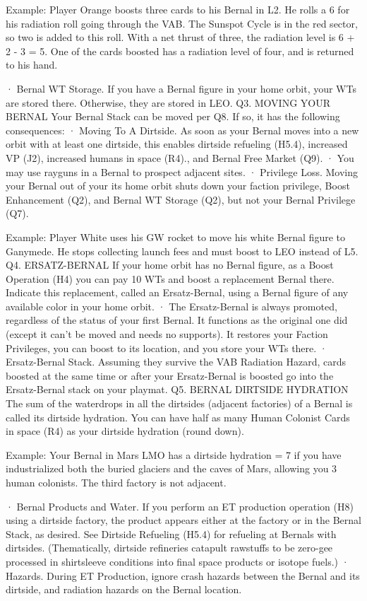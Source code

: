 \documentclass[a4paper]{book}
\begin{document}
Example: Player Orange boosts three cards to his Bernal in L2. He rolls a 6 for his radiation roll going through the VAB. The Sunspot Cycle is in the red sector, so two is added to this roll. With a net thrust of three, the radiation level is 6 + 2 - 3 = 5. One of the cards boosted has a radiation level of four, and is returned to his hand.

·       Bernal WT Storage. If you have a Bernal figure in your home orbit, your WTs are stored there. Otherwise, they are stored in LEO.
Q3. MOVING YOUR BERNAL
Your Bernal Stack can be moved per Q8. If so, it has the following consequences:
·       Moving To A Dirtside. As soon as your Bernal moves into a new orbit with at least one dirtside, this enables dirtside refueling (H5.4), increased VP (J2), increased humans in space (R4)., and Bernal Free Market (Q9).
·       You may use rayguns in a Bernal to prospect adjacent sites.
·       Privilege Loss. Moving your Bernal out of your its home orbit shuts down your faction privilege, Boost Enhancement (Q2), and Bernal WT Storage (Q2), but not your Bernal Privilege (Q7).

Example: Player White uses his GW rocket to move his white Bernal figure to Ganymede. He stops collecting launch fees and must boost to LEO instead of L5.
Q4. ERSATZ-BERNAL
If your home orbit has no Bernal figure, as a Boost Operation (H4) you can pay 10 WTs and boost a replacement Bernal there. Indicate this replacement, called an Ersatz-Bernal, using a Bernal figure of any available color in your home orbit.
·       The Ersatz-Bernal is always promoted, regardless of the status of your first Bernal. It functions as the original one did (except it can’t be moved and needs no supports). It restores your Faction Privileges, you can boost to its location, and you store your WTs there.
·       Ersatz-Bernal Stack. Assuming they survive the VAB Radiation Hazard, cards boosted at the same time or after your Ersatz-Bernal is boosted go into the Ersatz-Bernal stack on your playmat.
Q5. BERNAL DIRTSIDE HYDRATION
The sum of the waterdrops in all the dirtsides (adjacent factories) of a Bernal is called its dirtside hydration. You can have half as many Human Colonist Cards in space (R4) as your dirtside hydration (round down).

Example: Your Bernal in Mars LMO has a dirtside hydration = 7 if you have industrialized both the buried glaciers and the caves of Mars, allowing you 3 human colonists. The third factory is not adjacent.

·       Bernal Products and Water. If you perform an ET production operation (H8) using a dirtside factory, the product appears either at the factory or in the Bernal Stack, as desired. See Dirtside Refueling (H5.4) for refueling at Bernals with dirtsides. (Thematically, dirtside refineries catapult rawstuffs to be zero-gee processed in shirtsleeve conditions into final space products or isotope fuels.)
·       Hazards. During ET Production, ignore crash hazards between the Bernal and its dirtside, and radiation hazards on the Bernal location.
\end{document}
